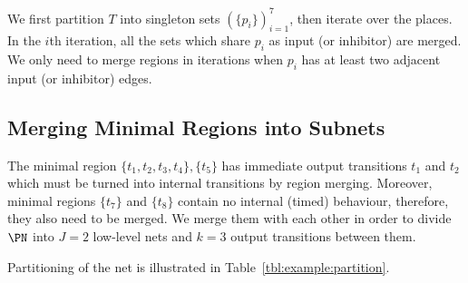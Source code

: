 We first partition $T$ into singleton sets $(\{p_i\})_{i = 1}^7$, then
iterate over the places. In the $i$th iteration, all the sets which
share $p_i$ as input (or inhibitor) are merged. We only need to merge
regions in iterations when $p_i$ has at least two adjacent input (or
inhibitor) edges.

\subsection{Merging Minimal Regions into Subnets}

The minimal region $\{t_1, t_2, t_3, t_4\}, \{t_5\}$ has immediate
output transitions $t_1$ and $t_2$ which must be turned into internal
transitions by region merging. Moreover, minimal regions $\{t_7\}$ and
$\{t_8\}$ contain no internal (timed) behaviour, therefore, they also
need to be merged. We merge them with each other in order to divide
$\PN$ into $J = 2$ low-level nets and $k = 3$ output transitions
between them.

Partitioning of the net is illustrated in
Table~\ref{tbl:example:partition}.

